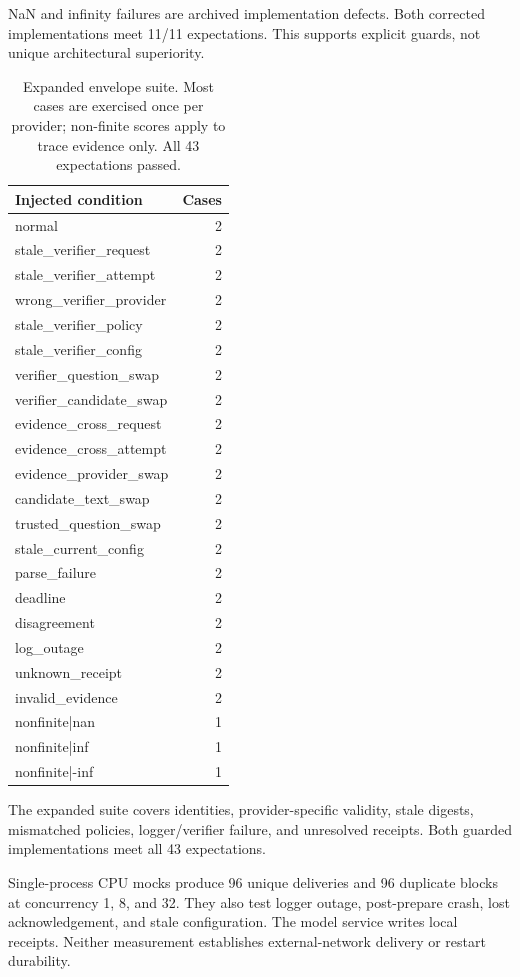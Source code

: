 \documentclass[journal,onecolumn]{IEEEtran}
\begin{document}
NaN and infinity failures are archived implementation defects. Both corrected implementations meet 11/11 expectations. This supports explicit guards, not unique architectural superiority.
\begin{table}[H]
\centering
\caption{Expanded envelope suite. Most cases are exercised once per provider; non-finite scores apply to trace evidence only. All 43 expectations passed.}\label{tab:binding}
\footnotesize
\setlength{\tabcolsep}{4pt}
\begin{tabular}{@{}lr@{}}
\toprule
Injected condition & Cases\\
\midrule
normal & 2\\
stale\_verifier\_request & 2\\
stale\_verifier\_attempt & 2\\
wrong\_verifier\_provider & 2\\
stale\_verifier\_policy & 2\\
stale\_verifier\_config & 2\\
verifier\_question\_swap & 2\\
verifier\_candidate\_swap & 2\\
evidence\_cross\_request & 2\\
evidence\_cross\_attempt & 2\\
evidence\_provider\_swap & 2\\
candidate\_text\_swap & 2\\
trusted\_question\_swap & 2\\
stale\_current\_config & 2\\
parse\_failure & 2\\
deadline & 2\\
disagreement & 2\\
log\_outage & 2\\
unknown\_receipt & 2\\
invalid\_evidence & 2\\
nonfinite|nan & 1\\
nonfinite|inf & 1\\
nonfinite|-inf & 1\\
\bottomrule
\end{tabular}
\end{table}

The expanded suite covers identities, provider-specific validity, stale digests, mismatched policies, logger/verifier failure, and unresolved receipts. Both guarded implementations meet all 43 expectations.

Single-process CPU mocks produce 96 unique deliveries and 96 duplicate blocks at concurrency 1, 8, and 32. They also test logger outage, post-prepare crash, lost acknowledgement, and stale configuration. The model service writes local receipts. Neither measurement establishes external-network delivery or restart durability.
\end{document}
